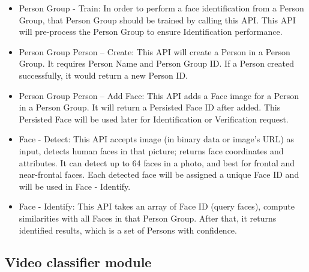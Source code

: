 \begin{itemize}
\item Person Group - Train: In order to perform a face identification from a Person Group, that Person Group should be trained by calling this API. This API will pre-process the Person Group to ensure Identification performance.
\item Person Group Person – Create: This API will create a Person in a Person Group. It requires Person Name and Person Group ID. If a Person created successfully, it would return a new Person ID.
\item Person Group Person – Add Face: This API adds a Face image for a Person in a Person Group. It will return a Persisted Face ID after added. This Persisted Face will be used later for Identification or Verification request.
\item Face - Detect: This API accepts image (in binary data or image’s URL) as input, detects human faces in that picture; returns face coordinates and attributes. It can detect up to 64 faces in a photo, and best for frontal and near-frontal faces. Each detected face will be assigned a unique Face ID and will be used in Face - Identify.
\item Face - Identify: This API takes an array of Face ID (query faces), compute similarities with all Faces in that Person Group. After that, it returns identified results, which is a set of Persons with confidence.
\end{itemize}
\subsection{Video classifier module}
